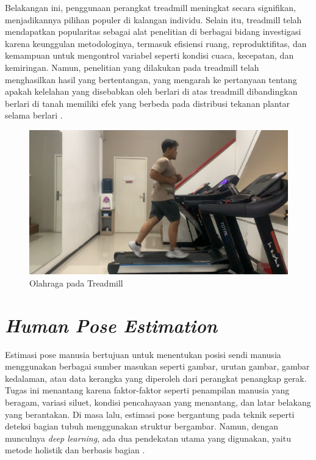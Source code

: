 Belakangan ini, penggunaan perangkat treadmill meningkat secara signifikan, menjadikannya pilihan populer di kalangan individu. Selain itu, treadmill telah mendapatkan popularitas sebagai alat penelitian di berbagai bidang investigasi karena keunggulan metodologinya, termasuk efisiensi ruang, reproduktifitas, dan kemampuan untuk mengontrol variabel seperti kondisi cuaca, kecepatan, dan kemiringan. Namun, penelitian yang dilakukan pada treadmill telah menghasilkan hasil yang bertentangan, yang mengarah ke pertanyaan tentang apakah kelelahan yang disebabkan oleh berlari di atas treadmill dibandingkan berlari di tanah memiliki efek yang berbeda pada distribusi tekanan plantar selama berlari \parencite{Pakbaz}.

\begin{figure}[H]
  \centering
  \includegraphics[scale=0.35]{gambar/treadmill.png}
  \caption{Olahraga pada Treadmill}
  \label{fig:treadmillrun}
\end{figure}

\section{\emph{Human Pose Estimation}}
\label{sec:deteksigesturtubuh}

Estimasi pose manusia bertujuan untuk menentukan posisi sendi manusia menggunakan berbagai sumber masukan seperti gambar, urutan gambar, gambar kedalaman, atau data kerangka yang diperoleh dari perangkat penangkap gerak. Tugas ini menantang karena faktor-faktor seperti penampilan manusia yang beragam, variasi siluet, kondisi pencahayaan yang menantang, dan latar belakang yang berantakan. Di masa lalu, estimasi pose bergantung pada teknik seperti deteksi bagian tubuh menggunakan struktur bergambar. Namun, dengan munculnya \emph{deep learning}, ada dua pendekatan utama yang digunakan, yaitu metode holistik dan berbasis bagian \parencite{Shetty}.

